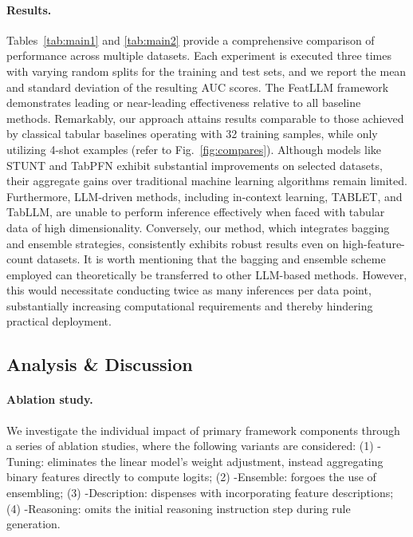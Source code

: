\vspace*{-0.12in}
\paragraph{Results.}
Tables~\ref{tab:main1} and \ref{tab:main2} provide a comprehensive comparison of performance across multiple datasets. Each experiment is executed three times with varying random splits for the training and test sets, and we report the mean and standard deviation of the resulting AUC scores. The \textsf{FeatLLM} framework demonstrates leading or near-leading effectiveness relative to all baseline methods. Remarkably, our approach attains results comparable to those achieved by classical tabular baselines operating with 32 training samples, while only utilizing 4-shot examples (refer to Fig.~\ref{fig:compares}). Although models like STUNT and TabPFN exhibit substantial improvements on selected datasets, their aggregate gains over traditional machine learning algorithms remain limited. Furthermore, LLM-driven methods, including in-context learning, TABLET, and TabLLM, are unable to perform inference effectively when faced with tabular data of high dimensionality. Conversely, our method, which integrates bagging and ensemble strategies, consistently exhibits robust results even on high-feature-count datasets. It is worth mentioning that the bagging and ensemble scheme employed can theoretically be transferred to other LLM-based methods. However, this would necessitate conducting twice as many inferences per data point, substantially increasing computational requirements and thereby hindering practical deployment.

\subsection{Analysis \& Discussion}
\label{sec:analysis}
\paragraph{Ablation study.} We investigate the individual impact of primary framework components through a series of ablation studies, where the following variants are considered: (1) \textsf{-Tuning}: eliminates the linear model's weight adjustment, instead aggregating binary features directly to compute logits; (2) \textsf{-Ensemble}: forgoes the use of ensembling; (3) \textsf{-Description}: dispenses with incorporating feature descriptions; (4) \textsf{-Reasoning}: omits the initial reasoning instruction step during rule generation.

